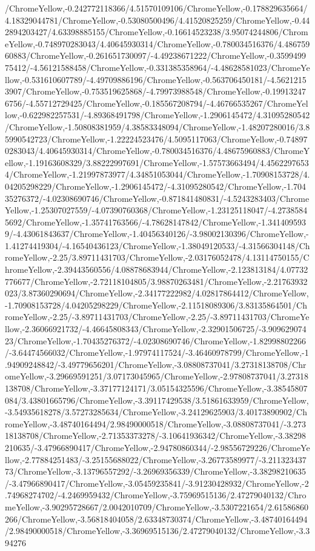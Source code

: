 {\begin{tikzternal}
/ChromeYellow,-0.242772118366/4.51570109106/ChromeYellow,-0.178829635664/4.18329044781/ChromeYellow,-0.53080500496/4.41520825259/ChromeYellow,-0.442894203427/4.63398885155/ChromeYellow,-0.16614523238/3.95074244806/ChromeYellow,-0.748970283043/4.40645930314/ChromeYellow,-0.780034516376/4.48675960883/ChromeYellow,-0.261651730097/-4.49238671222/ChromeYellow,-0.359949975412/-4.56121588458/ChromeYellow,-0.331385358964/-4.48628581023/ChromeYellow,-0.531610607789/-4.49709886196/ChromeYellow,-0.563706450181/-4.56212153907/ChromeYellow,-0.753519625868/-4.79973988548/ChromeYellow,-0.199132476756/-4.55712729425/ChromeYellow,-0.185567208794/-4.46766535267/ChromeYellow,-0.622982257531/-4.89368491798/ChromeYellow,-1.2906145472/4.31095280542/ChromeYellow,-1.50808381959/4.38583348094/ChromeYellow,-1.48207280016/3.85990542723/ChromeYellow,-1.22224523476/4.5095117063/ChromeYellow,-0.748970283043/4.40645930314/ChromeYellow,-0.780034516376/4.48675960883/ChromeYellow,-1.19163608329/3.88222997691/ChromeYellow,-1.57573663494/4.45622976534/ChromeYellow,-1.21997873977/4.34851053044/ChromeYellow,-1.70908153728/4.04205298229/ChromeYellow,-1.2906145472/-4.31095280542/ChromeYellow,-1.70435276372/-4.02308690746/ChromeYellow,-0.871841480831/-4.5243283403/ChromeYellow,-1.25307027559/-4.07390760368/ChromeYellow,-1.23125118047/-4.27385845692/ChromeYellow,-1.35741763566/-4.78628147842/ChromeYellow,-1.3414095939/-4.43061843637/ChromeYellow,-1.40456340126/-3.98002130396/ChromeYellow,-1.41274419304/-4.16540436123/ChromeYellow,-1.38049120533/-4.31566304148/ChromeYellow,-2.25/3.89711431703/ChromeYellow,-2.03176052478/4.13114750155/ChromeYellow,-2.39443560556/4.08878683944/ChromeYellow,-2.123813184/4.07732776677/ChromeYellow,-2.72118104805/3.98870263481/ChromeYellow,-2.21763932023/3.87360290694/ChromeYellow,-2.34177222982/4.02817864412/ChromeYellow,-1.70908153728/4.04205298229/ChromeYellow,-2.11518089306/3.83135864501/ChromeYellow,-2.25/-3.89711431703/ChromeYellow,-2.25/-3.89711431703/ChromeYellow,-2.36066921732/-4.46645808343/ChromeYellow,-2.32901506725/-3.90962907423/ChromeYellow,-1.70435276372/-4.02308690746/ChromeYellow,-1.82998802266/-3.64474566032/ChromeYellow,-1.97974117524/-3.46460978799/ChromeYellow,-1.94909248842/-3.49779656201/ChromeYellow,-3.08808737041/3.27318138708/ChromeYellow,-3.29669591251/3.07173045965/ChromeYellow,-2.97808737041/3.27318138708/ChromeYellow,-3.37177124171/3.05154325596/ChromeYellow,-3.38545807084/3.43801665796/ChromeYellow,-3.39117429538/3.51861633959/ChromeYellow,-3.54935618278/3.57273285634/ChromeYellow,-3.24129625903/3.40173890902/ChromeYellow,-3.48740164494/2.98490000518/ChromeYellow,-3.08808737041/-3.27318138708/ChromeYellow,-2.71353373278/-3.10641936342/ChromeYellow,-3.38298210635/-3.47966890417/ChromeYellow,-2.94780860344/-2.98556729226/ChromeYellow,-2.77884251483/-3.25155688022/ChromeYellow,-3.26773589977/-3.21132343773/ChromeYellow,-3.13796557292/-3.26969356339/ChromeYellow,-3.38298210635/-3.47966890417/ChromeYellow,-3.05459235841/-3.91230428932/ChromeYellow,-2.74968274702/-4.2469959432/ChromeYellow,-3.75969515136/2.47279040132/ChromeYellow,-3.90295728667/2.0042010709/ChromeYellow,-3.5307221654/2.61586860266/ChromeYellow,-3.56818404058/2.63348730374/ChromeYellow,-3.48740164494/2.98490000518/ChromeYellow,-3.36969515136/2.47279040132/ChromeYellow,-3.394276
\end{tikzternal}}
